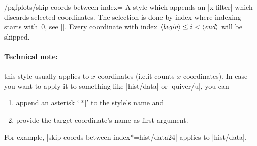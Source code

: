 \begin{stylekey}{/pgfplots/skip coords between index=}
    A style which appends an |x filter| which discards selected coordinates.
    The selection is done by index where indexing starts with~$0$, see
    |\coordindex|. Every coordinate with index $\langle\textit{begin}\rangle \le i <
    \langle\textit{end}\rangle$ will be skipped.
\begin{codeexample}[]
\end{codeexample}

    \paragraph{Technical note:}

    this style usually applies to $x$-coordinates (i.e.\@ it counts
    $x$-coordinates). In case you want to apply it to something like |hist/data|
    or |quiver/u|, you can
    \begin{enumerate}
        \item append an asterisk `|*|' to the style's name and
        \item provide the target coordinate's name as first argument.
    \end{enumerate}
    For example, |skip coords between index*={hist/data}{2}{4}| applies to
    |hist/data|.
\end{stylekey}

